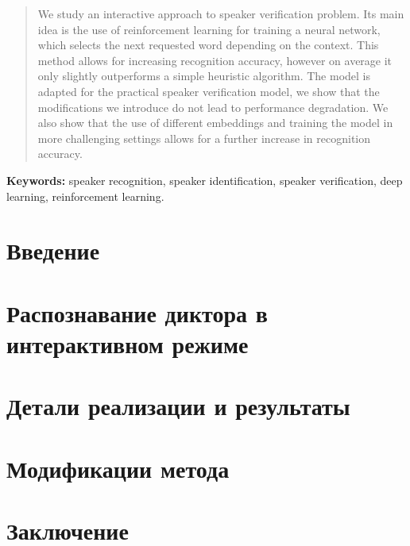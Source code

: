 \documentclass[14pt]{spbau-diploma}
\begin{document}
\begin{otherlanguage}{english}
\begin{abstract}
    We study an interactive approach to speaker verification problem. Its main
    idea is the use of reinforcement learning for training a neural network,
    which selects the next requested word depending on the context. This method
    allows for increasing recognition accuracy, however on average it only
    slightly outperforms a simple heuristic algorithm. The model is adapted for
    the practical speaker verification model, we show that the modifications we
    introduce do not lead to performance degradation. We also show that the use
    of different embeddings and training the model in more challenging settings
    allows for a further increase in recognition accuracy.
\end{abstract}
\end{otherlanguage}

\textbf{Keywords:} speaker recognition, speaker identification, speaker
verification, deep learning, reinforcement learning.

\newpage
\tableofcontents

\newpage
\section*{Введение}\label{sec:intro}



\newpage
\section{Распознавание диктора в интерактивном режиме}\label{sec:theory}



\newpage
\section{Детали реализации и результаты}\label{sec:experiments}



\newpage
\section{Модификации метода}\label{sec:modifications}



\newpage
\section*{Заключение}





\end{document}
